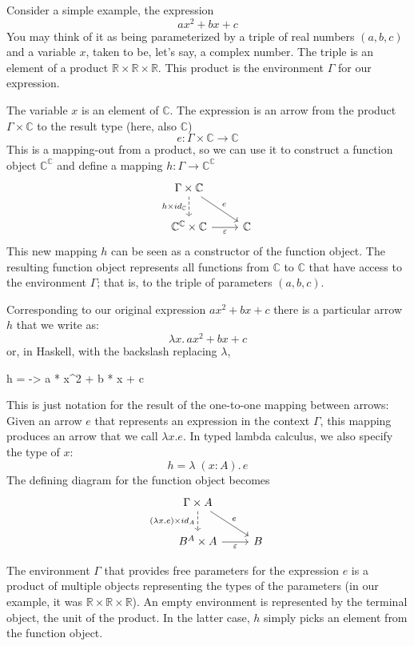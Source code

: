 \documentclass[DaoFP]{subfiles}
\begin{document}
Consider a simple example, the expression
\[a x^2 + b x + c\]
You may think of it as being parameterized by a triple of real numbers $(a, b, c)$ and a variable $x$, taken to be, let's say, a complex number. The triple is an element of a product $\mathbb{R} \times \mathbb{R} \times \mathbb{R}$. This product is the environment $\Gamma$ for our expression. 

The variable $x$ is an element of $\mathbb{C}$. The expression is an arrow from the product $\Gamma \times \mathbb{C}$ to the result type (here, also $\mathbb{C}$)
\[e \colon \Gamma \times \mathbb{C} \to \mathbb{C} \]
This is a mapping-out from a product, so we can use it to construct a function object  $\mathbb{C}^{\mathbb{C}}$ and define a mapping $h \colon \Gamma \to \mathbb{C}^{\mathbb{C}}$
\[
 \begin{tikzcd}
 \Gamma \times \mathbb{C}
 \arrow[d, dashed, "h \times id_{\mathbb{C}}"']
 \arrow[rd, "e"]
 \\
 \mathbb{C}^{\mathbb{C}} \times \mathbb{C}
 \arrow[r, "\varepsilon"']
& \mathbb{C}
 \end{tikzcd}
\]
This new mapping $h$ can be seen as a constructor of the function object. The resulting function object represents all functions from $\mathbb{C}$ to $\mathbb{C}$ that have access to the environment $\Gamma$; that is, to the triple of parameters $(a, b, c)$. 

Corresponding to our original expression $a x^2 + b x + c$ there is a particular arrow $h$ that we write as:
\[ \lambda x . \,a x^2 + b x + c \]
or, in Haskell, with the backslash replacing $\lambda$,
\begin{haskell}
h = \x -> a * x^2 + b * x + c
\end{haskell}

This is just notation for the result of the one-to-one mapping between arrows: Given an arrow $e$ that represents an expression in the context $\Gamma$, this mapping produces an arrow that we call $\lambda x . e$. In typed lambda calculus, we also specify the type of $x$:
\[h = \lambda\;  (x \colon A) . \, e\]
The defining diagram for the function object becomes
\[
 \begin{tikzcd}
 \Gamma \times A
 \arrow[d, dashed, "{(\lambda x  . e) \times id_A}"']
 \arrow[rd, "e"]
 \\
 B^A \times A
 \arrow[r, "\varepsilon"']
& B
 \end{tikzcd}
\]

The environment $\Gamma$ that provides free parameters for the expression $e$ is a product of multiple objects representing the types of the parameters (in our example, it was $\mathbb{R} \times \mathbb{R} \times \mathbb{R}$). An empty environment is represented by the terminal object, the unit of the product. In the latter case, $h$ simply picks an element from the function object. 
\end{document}

